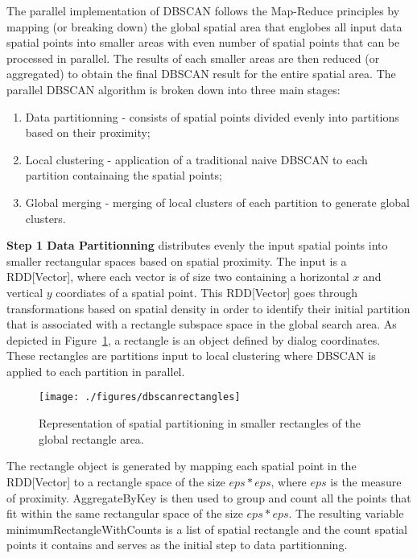 The parallel implementation of DBSCAN follows the Map-Reduce principles by mapping (or breaking down) the global spatial area that englobes all input data spatial points into smaller areas with even number of spatial points that can be processed in parallel. The results of each smaller areas are then reduced (or aggregated) to obtain the final DBSCAN result for the entire spatial area. The parallel DBSCAN algorithm is broken down into three main stages: 
\begin{enumerate}
	\item Data partitionning - consists of spatial points divided evenly into partitions based on their proximity;
	\item Local clustering - application of a traditional naive DBSCAN to each partition containaing the spatial points;
	\item Global merging - merging of local clusters of each partition to generate global clusters.
\end{enumerate}

\textbf{Step 1 Data Partitionning} distributes evenly the input spatial points into smaller rectangular spaces based on spatial proximity. The input is a \textsf{RDD[Vector]}, where each vector is of size two containing a horizontal $x$ and vertical $y$ coordiates of a spatial point. This \textsf{RDD[Vector]} goes through transformations based on spatial density in order to identify their initial partition that is associated with a rectangle subspace space in the global search area. As depicted in Figure~\ref{fig:dbscanrectangles}, a rectangle is an object defined by dialog coordinates. These rectangles are partitions  input to local clustering where DBSCAN is applied to each partition in parallel.

\begin{figure}
	\texttt{[image: ./figures/dbscanrectangles]}
	\caption{Representation of spatial partitioning in smaller rectangles of the global rectangle area.}
	\label{fig:dbscanrectangles}
\end{figure}


The rectangle object is generated by mapping each spatial point in the \textsf{RDD[Vector]} to a rectangle space of the size $eps * eps$, where $eps$ is the measure of proximity. \textsf{AggregateByKey} is then used to group and count all the points that fit within the same rectangular space of the size $eps * eps$. The resulting variable \textsf{minimumRectangleWithCounts} is a list of spatial rectangle and the count spatial points it contains and serves as the initial step to data partitionning.

